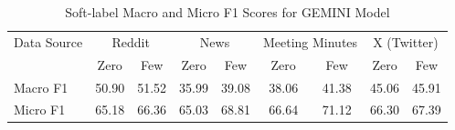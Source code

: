 \begin{table}[htbp]
\centering
\begin{tabular}{l *{8}{c}}
\toprule
Data Source & \multicolumn{2}{c}{Reddit} & \multicolumn{2}{c}{News} & \multicolumn{2}{c}{Meeting Minutes} & \multicolumn{2}{c}{X (Twitter)} \\
& Zero & Few & Zero & Few & Zero & Few & Zero & Few \\
\midrule
Macro F1 & 50.90 & 51.52 & 35.99 & 39.08 & 38.06 & 41.38 & 45.06 & 45.91 \\
Micro F1 & 65.18 & 66.36 & 65.03 & 68.81 & 66.64 & 71.12 & 66.30 & 67.39 \\
\bottomrule
\end{tabular}
\centering\caption{Soft-label Macro and Micro F1 Scores for GEMINI Model}
\label{tab:gemini_macro_micro}
\end{table}